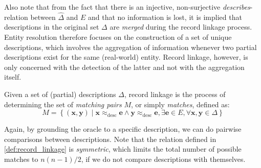 \documentclass{article}
\newcommand{\entity}{\bm{e}}  %
\newcommand{\describes}{\ensuremath{\approx_\mathrm{desc}}}
\begin{document}
Also note that from the fact that there is an injective, non-surjective \emph{describes}-relation between $\hat{\Delta}$ and $E$ and that no information is lost, it is implied that descriptions in the original set $\Delta$ are \emph{merged} during the record linkage process.
Entity resolution therefore focuses on the construction of a set of unique descriptions, which involves the aggregation of information whenever two partial descriptions exist for the same (real-world) entity.
Record linkage, however, is only concerned with the detection of the latter and not with the aggregation itself.

\begin{definition}
    Given a set of (partial) descriptions $\Delta$, record linkage is the process of determining the set of \emph{matching pairs} $M$, or simply \emph{matches}, defined as:
    \begin{equation*}
        M = \left\{ (\bm{x}, \bm{y}) \mid \bm{x} \describes \entity \wedge \bm{y} \describes \entity, \exists \entity \in E, \forall \bm{x}, \bm{y} \in \Delta \right\}
    \end{equation*}
    \label{def:record_linkage}
\end{definition}

Again, by grounding the oracle to a specific description, we can do pairwise comparisons between descriptions.
Note that the relation defined in \cref{def:record_linkage} is \emph{symmetric}, which limits the total number of possible matches to $n(n-1)/2$, if we do not compare descriptions with themselves.
\end{document}
